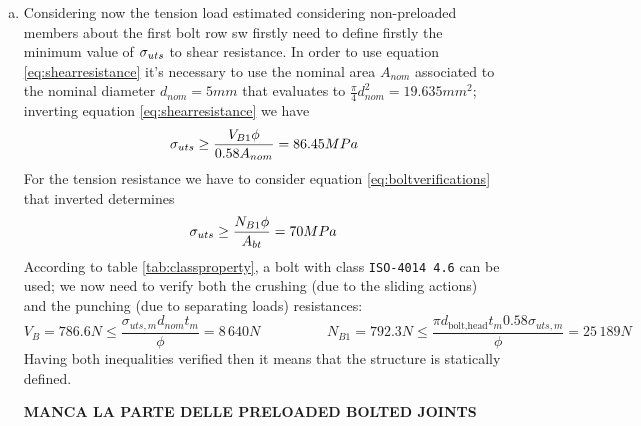 \begin{enumerate}[a)]
		\item Considering now the tension load estimated considering non-preloaded members about the first bolt row sw firstly need to define firstly the minimum value of $\sigma_{uts}$ to shear resistance. In order to use equation \ref{eq:shearresistance} it's necessary to use the nominal area $A_{nom}$ associated to the nominal diameter $d_{nom} = 5mm$ that evaluates to $\frac \pi 4 d_{nom}^2 = 19.635mm^2$; inverting equation \ref{eq:shearresistance} we have
		\[ \sigma_{uts} \geq \frac{V_{B1} \phi}{0.58 A_{nom}} = 86.45MPa \]
		For the tension resistance we have to consider equation \ref{eq:boltverifications} that inverted determines
		\[ \sigma_{uts} \geq \frac{N_{B1} \phi}{A_{bt}} = 70 MPa  \]
		According to table \ref{tab:classproperty}, a bolt with class \texttt{ISO-4014 4.6} can be used; we now need to verify both the crushing (due to the sliding actions) and the punching (due to separating loads) resistances:
		\[ V_B = 786.6 N \leq \frac{\sigma_{uts,m} d_{nom}t_m}{\phi} = 8\,640 N \hspace{2cm} N_{B1} = 792.3N \leq \frac{\pi d_\textrm{bolt,head} t_m 0.58 \sigma_{uts,m}}{\phi} =25\,189 N \]
		Having both inequalities verified then it means that the structure is statically defined.
		
		
		\textbf{MANCA LA PARTE DELLE PRELOADED BOLTED JOINTS}
		
	\end{enumerate}
